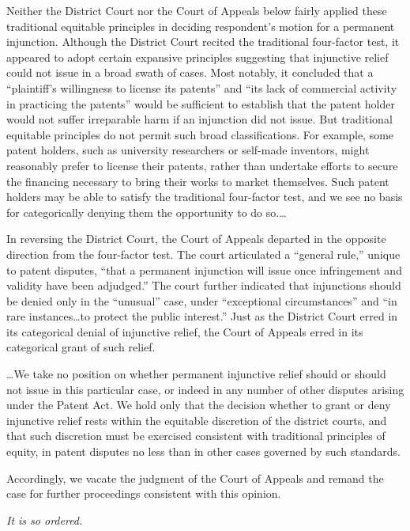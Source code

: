 Neither the District Court nor the Court of Appeals below fairly applied these
traditional equitable principles in deciding respondent's motion for a permanent
injunction. Although the District Court recited the traditional four-factor
test, it appeared to adopt certain expansive principles
suggesting that injunctive relief could not issue in a broad swath of cases.
Most notably, it concluded that a ``plaintiff's willingness to license its
patents'' and ``its lack of commercial activity in practicing the patents''
would be sufficient to establish that the patent holder would not suffer
irreparable harm if an injunction did not issue. But
traditional equitable principles do not permit such broad classifications. For
example, some patent holders, such as university researchers or self-made
inventors, might reasonably prefer to license their patents, rather than
undertake efforts to secure the financing necessary to bring their works to
market themselves. Such patent holders may be able to satisfy the traditional
four-factor test, and we see no basis for categorically denying them the
opportunity to do so.\ldots

In reversing the District Court, the Court of Appeals departed in the opposite
direction from the four-factor test. The court articulated a ``general rule,''
unique to patent disputes, ``that a permanent injunction will issue once
infringement and validity have been adjudged.'' The court
further indicated that injunctions should be denied only in the ``unusual''
case, under ``exceptional circumstances'' and ``in rare instances\ldots to
protect the public interest.'' Just as the District
Court erred in its categorical denial of injunctive relief, the Court of Appeals
erred in its categorical grant of such relief.

\ldots We take no position on whether
permanent injunctive relief should or should not issue in this particular case,
or indeed in any number of other disputes arising under the Patent Act. We hold
only that the decision whether to grant or deny injunctive relief rests within
the equitable discretion of the district courts, and that such discretion must
be exercised consistent with traditional principles of equity, in patent
disputes no less than in other cases governed by such standards.

Accordingly, we vacate the judgment of the Court of Appeals and remand the case
for further proceedings consistent with this opinion.

\textit{It is so ordered.}

